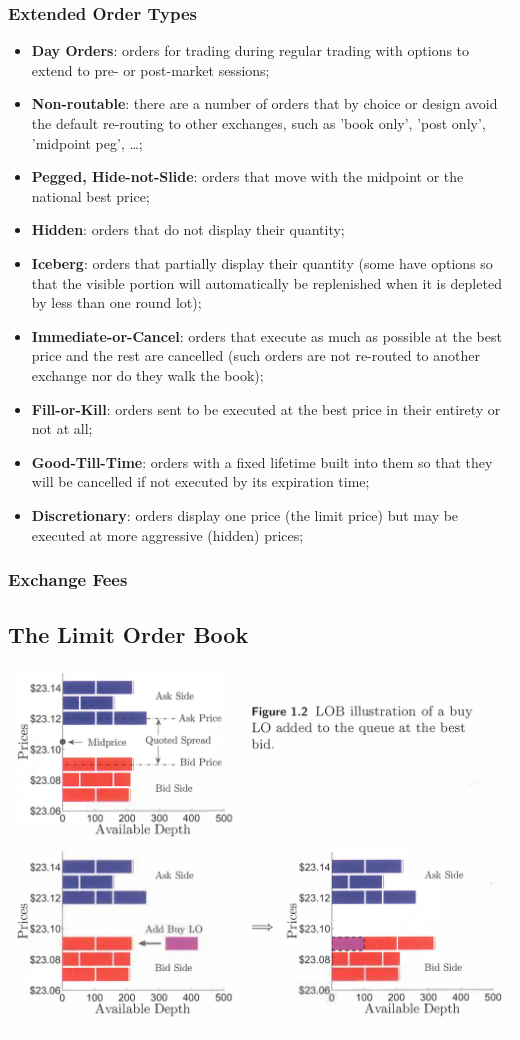 \documentclass[11pt]{article}
\begin{document}
\subsubsection{Extended Order Types}
\label{sec:org7d192aa}
\begin{itemize}
\item \textbf{Day Orders}: orders for trading during regular trading with options to extend to pre- or post-market sessions;
\item \textbf{Non-routable}: there are a number of orders that by choice or design avoid the default re-routing to
other exchanges, such as 'book only', 'post only', 'midpoint peg', \ldots{};
\item \textbf{Pegged, Hide-not-Slide}: orders that move with the midpoint or the national best price;
\item \textbf{Hidden}: orders that do not display their quantity;
\item \textbf{Iceberg}: orders that partially display their quantity (some have options so that the visible portion
will automatically be replenished when it is depleted by less than one round lot);
\item \textbf{Immediate-or-Cancel}: orders that execute as much as possible at the best price and the rest are
cancelled (such orders are not re-routed to another exchange nor do they walk the book);
\item \textbf{Fill-or-Kill}: orders sent to be executed at the best price in their entirety or not at all;
\item \textbf{Good-Till-Time}: orders with a fixed lifetime built into them so that they will be cancelled if not
executed by its expiration time;
\item \textbf{Discretionary}: orders display one price (the limit price) but may be executed at more aggressive
(hidden) prices;
\end{itemize}
\subsubsection{Exchange Fees}
\label{sec:org31c46bb}
\subsection{The Limit Order Book}
\label{sec:org74c840e}
\begin{center}
\includegraphics[width=.8\textwidth]{../images/Misc/16.png}
\label{f1.2}
\end{center}
\end{document}
